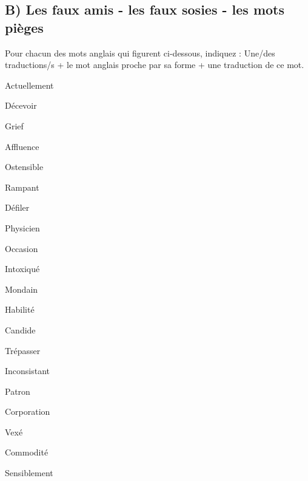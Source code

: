 \documentclass[a4paper,english,bookmarks]{article}
\begin{document}
\subsection*{B) Les faux amis - les faux sosies - les mots pièges}

Pour chacun des mots anglais qui figurent ci-dessous, indiquez : Une/des traductions/s + le mot anglais proche par sa forme + une traduction de ce mot.

\begin{enumerate}
    \begin{minipage}{0.45\linewidth}
        \item Actuellement
        \item Décevoir
        \item Grief
        \item Affluence
        \item Ostensible
        \item Rampant
        \item Défiler
        \item Physicien
        \item Occasion
        \item Intoxiqué
    \end{minipage}
    \hfill 
    \begin{minipage}{0.45\linewidth}
        \item Mondain
        \item Habilité
        \item Candide
        \item Trépasser
        \item Inconsistant
        \item Patron
        \item Corporation
        \item Vexé
        \item Commodité
        \item Sensiblement
    \end{minipage}
\end{enumerate}
\end{document}
